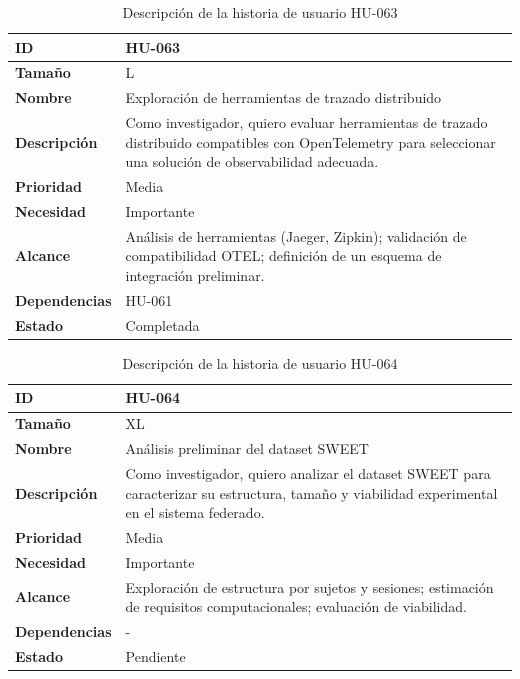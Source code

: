 \documentclass{report}
\begin{document}
\begin{table}[H]
\centering
\caption{Descripción de la historia de usuario HU-063}
\label{tab:hu063}
\begin{tabular}{|l|p{12cm}|}
\hline
\textbf{ID} & HU-063 \\ \hline
\textbf{Tamaño} & L \\ \hline
\textbf{Nombre} & Exploración de herramientas de trazado distribuido \\ \hline
\textbf{Descripción} &
Como investigador, quiero evaluar herramientas de trazado distribuido compatibles con OpenTelemetry para seleccionar una solución de observabilidad adecuada. \\ \hline
\textbf{Prioridad} & Media \\ \hline
\textbf{Necesidad} & Importante \\ \hline
\textbf{Alcance} &
Análisis de herramientas (Jaeger, Zipkin); validación de compatibilidad OTEL; definición de un esquema de integración preliminar. \\ \hline
\textbf{Dependencias} & HU-061 \\ \hline
\textbf{Estado} & Completada \\ \hline
\end{tabular}
\end{table}


\begin{table}[H]
\centering
\caption{Descripción de la historia de usuario HU-064}
\label{tab:hu064}
\begin{tabular}{|l|p{12cm}|}
\hline
\textbf{ID} & HU-064 \\ \hline
\textbf{Tamaño} & XL \\ \hline
\textbf{Nombre} & Análisis preliminar del dataset SWEET \\ \hline
\textbf{Descripción} &
Como investigador, quiero analizar el dataset SWEET para caracterizar su estructura, tamaño y viabilidad experimental en el sistema federado. \\ \hline
\textbf{Prioridad} & Media \\ \hline
\textbf{Necesidad} & Importante \\ \hline
\textbf{Alcance} &
Exploración de estructura por sujetos y sesiones; estimación de requisitos computacionales; evaluación de viabilidad. \\ \hline
\textbf{Dependencias} & - \\ \hline
\textbf{Estado} & Pendiente \\ \hline
\end{tabular}
\end{table}
\end{document}
